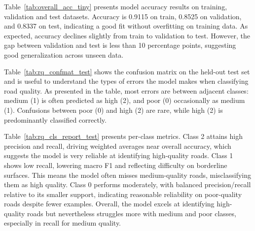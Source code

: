 
Table~\ref{tab:overall_acc_tiny} presents model accuracy results on training, validation and test datasets. Accuracy is 0.9115 on train, 0.8525 on validation, and 0.8337 on test, indicating a good fit without overfitting on training data. As expected, accuracy declines slightly from train to validation to test. However, the gap between validation and test is less than 10 percentage points, suggesting good generalization across unseen data. 

Table~\ref{tab:rq_confmat_test} shows the confusion matrix on the held-out test set and is useful to understand the types of errors the model makes when classifying road quality. As presented in the table, most errors are between adjacent classes: medium (1) is often predicted as high (2), and poor (0) occasionally as medium (1). Confusions between poor (0) and high (2) are rare, while high (2) is predominantly classified correctly.

Table~\ref{tab:rq_cls_report_test} presents per-class metrics. Class 2 attains high precision and recall, driving weighted averages near overall accuracy, which suggests the model is very reliable at identifying high-quality roads. Class 1 shows low recall, lowering macro F1 and reflecting difficulty on borderline surfaces. This means the model often misses medium-quality roads, misclassifying them as high quality. Class 0 performs moderately, with balanced precision/recall relative to its smaller support, indicating reasonable reliability on poor-quality roads despite fewer examples. Overall, the model excels at identifying high-quality roads but nevertheless struggles more with medium and poor classes, especially in recall for medium quality.


